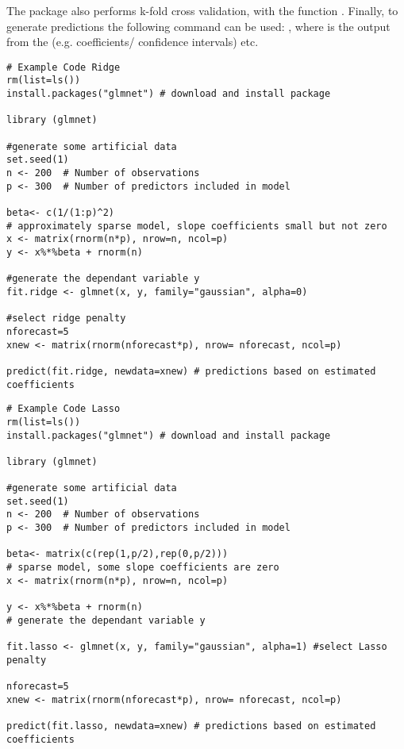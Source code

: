 \documentclass[12pt]{article}
\begin{document}
The package also performs k-fold cross validation, with the function . Finally, to generate predictions the following command can be used: , where  is the output from the  (e.g. coefficients/ confidence intervals) etc.

\begin{lstlisting}[title=\textbf{Ridge penalised regression.}]
# Example Code Ridge
rm(list=ls())
install.packages("glmnet") # download and install package

library (glmnet)

#generate some artificial data
set.seed(1)
n <- 200  # Number of observations
p <- 300  # Number of predictors included in model

beta<- c(1/(1:p)^2)
# approximately sparse model, slope coefficients small but not zero
x <- matrix(rnorm(n*p), nrow=n, ncol=p)
y <- x%*%beta + rnorm(n)

#generate the dependant variable y
fit.ridge <- glmnet(x, y, family="gaussian", alpha=0)

#select ridge penalty
nforecast=5
xnew <- matrix(rnorm(nforecast*p), nrow= nforecast, ncol=p)

predict(fit.ridge, newdata=xnew) # predictions based on estimated coefficients
\end{lstlisting}

\begin{lstlisting}[title=\textbf{Lasso regression.}]
# Example Code Lasso
rm(list=ls())
install.packages("glmnet") # download and install package

library (glmnet)

#generate some artificial data
set.seed(1)
n <- 200  # Number of observations
p <- 300  # Number of predictors included in model

beta<- matrix(c(rep(1,p/2),rep(0,p/2)))
# sparse model, some slope coefficients are zero
x <- matrix(rnorm(n*p), nrow=n, ncol=p)

y <- x%*%beta + rnorm(n)
# generate the dependant variable y

fit.lasso <- glmnet(x, y, family="gaussian", alpha=1) #select Lasso penalty

nforecast=5
xnew <- matrix(rnorm(nforecast*p), nrow= nforecast, ncol=p)

predict(fit.lasso, newdata=xnew) # predictions based on estimated coefficients
\end{lstlisting}
\end{document}
